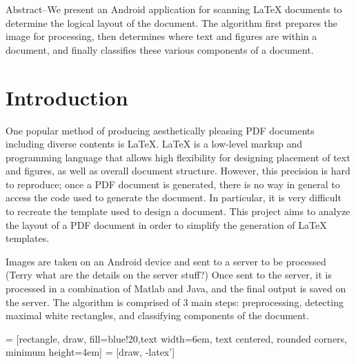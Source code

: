 \documentclass{report}
\begin{document}
Abstract--We present an Android application for scanning LaTeX documents to determine the logical layout of the document. The algorithm first prepares the image for processing, then determines where text and figures are within a document, and finally classifies these various components of a document. 


\section{Introduction}
One popular method of producing aesthetically pleasing PDF documents including diverse contents is LaTeX. LaTeX is a low-level markup and programming language that allows high flexibility for designing placement of text and figures, as well as overall document structure. However, this precision is hard to reproduce; once a PDF document is generated, there is no way in general to access the code used to generate the document. In particular, it is very difficult to recreate the template used to design a document. This project aims to analyze the layout of a PDF document in order to simplify the generation of LaTeX templates. 

Images are taken on an Android device and sent to a server to be processed (Terry what are the details on the server stuff?) Once sent to the server, it is processed in a combination of Matlab and Java, and the final output is saved on the server.  The algorithm is comprised of 3 main steps: preprocessing, detecting maximal white rectangles, and classifying components of the document. 

 = [rectangle, draw, fill=blue!20,text width=6em, text centered, rounded corners, minimum height=4em]
 = [draw, -latex']


\end{document}
